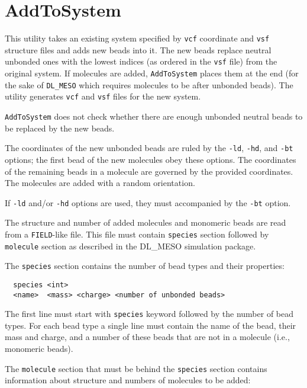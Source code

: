 \section{AddToSystem} \label{sec:AddToSystem}

This utility takes an existing system specified by \texttt{vcf} coordinate
and \texttt{vsf} structure files and adds new beads into it. The new beads
replace neutral unbonded ones with the lowest indices (as ordered in the
\texttt{vsf} file) from the original system. If molecules are added,
\texttt{AddToSystem} places them at the end (for the sake of
\texttt{DL\_MESO} which requires molecules to be after unbonded beads). The
utility generates \texttt{vcf} and \texttt{vsf} files for the new system.

\texttt{AddToSystem} does not check whether there are enough unbonded
neutral beads to be replaced by the new beads.

The coordinates of the new unbonded beads are ruled by the \texttt{-ld},
\texttt{-hd}, and \texttt{-bt} options; the first bead of the new molecules
obey these options. The coordinates of the remaining beads in a molecule
are governed by the provided coordinates. The molecules are added with a
random orientation.

If \texttt{-ld} and/or \texttt{-hd} options are used, they must accompanied
by the \texttt{-bt} option.

The structure and number of added molecules and monomeric beads are read
from a \texttt{FIELD}-like file. This file must contain \texttt{species}
section followed by \texttt{molecule} section as described in the DL\_MESO
simulation package.

The \texttt{species} section contains the number of bead types and their
properties:
\begin{verbatim}
  species <int>
  <name>  <mass> <charge> <number of unbonded beads>
\end{verbatim}
The first line must start with \texttt{species} keyword followed by the
number of bead types. For each bead type a single line must contain the name of
the bead, their mass and charge, and a number of these beads that are not
in a molecule (i.e., monomeric beads).

The \texttt{molecule} section that must be behind the \texttt{species}
section contains information about structure and numbers of molecules to be
added:

